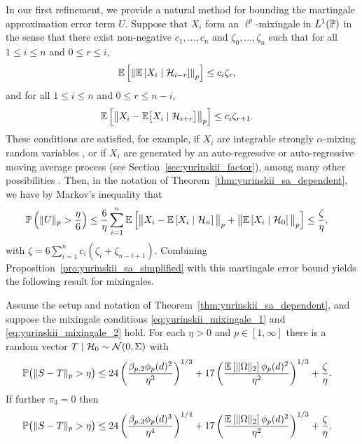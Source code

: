 In our first refinement, we provide a natural method for bounding the
martingale approximation error term $U$. Suppose that $X_i$ form an
$\ell^p$-mixingale in $L^1(\P)$ in the sense that there exist non-negative
$c_1, \ldots, c_n$ and $\zeta_0, \ldots, \zeta_n$ such that for all
$1 \leq i \leq n$ and $0 \leq r \leq i$,
%
\begin{align}
  \label{eq:yurinskii_mixingale_1}
  \E \left[ \left\|
    \E \left[ X_i \mid \cH_{i-r} \right]
  \right\|_p \right]
  &\leq
  c_i \zeta_r,
\end{align}
%
and for all $1 \leq i \leq n$ and $0 \leq r \leq n-i$,
%
\begin{align}
  \label{eq:yurinskii_mixingale_2}
  \E \left[ \big\|
    X_i - \E \big[ X_i \mid \cH_{i+r} \big]
  \big\|_p \right]
  &\leq
  c_i \zeta_{r+1}.
\end{align}
%
These conditions are satisfied, for example, if $X_i$ are integrable strongly
$\alpha$-mixing random variables \citep{mcleish1975invariance}, or if $X_i$ are
generated by an auto-regressive or auto-regressive moving average process (see
Section~\ref{sec:yurinskii_factor}), among many other possibilities
\citep{bradley2005basic}. Then, in the notation of
Theorem~\ref{thm:yurinskii_sa_dependent}, we have by Markov's inequality that
%
\begin{align*}
  \P \left( \|U\|_p > \frac{\eta}{6} \right)
  &\leq
  \frac{6}{\eta}
  \sum_{i=1}^{n}
  \E \left[
    \big\|
    X_i - \E \left[ X_i \mid \cH_n \right]
    \big\|_p
    + \big\|
    \E \left[ X_i \mid \cH_0 \right]
    \big\|_p
  \right]
  \leq \frac{\zeta}{\eta},
\end{align*}
%
with $\zeta = 6 \sum_{i=1}^{n} c_i (\zeta_{i} + \zeta_{n-i+1})$.
Combining Proposition~\ref{pro:yurinskii_sa_simplified} with this
martingale error bound yields the following result for mixingales.
%
\begin{corollary}%
  \label{cor:yurinskii_sa_mixingale}

  Assume the setup and notation of Theorem~\ref{thm:yurinskii_sa_dependent},
  and suppose
  the mixingale conditions \eqref{eq:yurinskii_mixingale_1} and
  \eqref{eq:yurinskii_mixingale_2} hold. For each $\eta > 0$ and
  $p \in [1,\infty]$ there
  is a random vector $T \mid \cH_0 \sim \cN(0, \Sigma)$ with
  \begin{align*}
    \P\big(\|S-T\|_p > \eta\big)
    &\leq
    24 \left(
      \frac{\beta_{p,2} \phi_p(d)^2}{\eta^3}
    \right)^{1/3}
    + 17 \left(
      \frac{\E \left[ \|\Omega\|_2 \right] \phi_p(d)^2}{\eta^2}
    \right)^{1/3}
    + \frac{\zeta}{\eta}.
  \end{align*}
  If further $\pi_3 = 0$ then
  \begin{align*}
    \P\big(\|S-T\|_p > \eta\big)
    &\leq
    24 \left(
      \frac{\beta_{p,3} \phi_p(d)^3}{\eta^4}
    \right)^{1/4}
    + 17 \left(
      \frac{\E \left[ \|\Omega\|_2 \right] \phi_p(d)^2}{\eta^2}
    \right)^{1/3}
    + \frac{\zeta}{\eta}.
  \end{align*}
\end{corollary}


